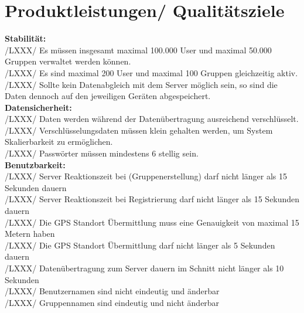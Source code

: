 \section{Produktleistungen/ Qualitätsziele}
\textbf{Stabilität:}\\
/LXXX/	Es müssen insgesamt maximal 100.000 User und maximal 50.000 Gruppen verwaltet werden können. \\
/LXXX/	Es sind maximal 200 User und maximal 100 Gruppen gleichzeitig aktiv. \\
/LXXX/	Sollte kein Datenabgleich mit dem Server möglich sein, so sind die Daten dennoch  auf den jeweiligen Geräten abgespeichert.	  \\
\textbf{Datensicherheit:}\\
/LXXX/	Daten werden während der Datenübertragung ausreichend verschlüsselt.\\
/LXXX/	Verschlüsselungsdaten müssen klein gehalten werden, um System Skalierbarkeit zu ermöglichen.\\
/LXXX/	Passwörter müssen mindestens 6 stellig sein.\\
\textbf{Benutzbarkeit:}\\
/LXXX/	Server Reaktionszeit bei (Gruppenerstellung) darf nicht länger als 15 Sekunden dauern\\
/LXXX/	Server Reaktionszeit bei Registrierung darf nicht länger als 15 Sekunden dauern\\
/LXXX/	Die GPS Standort Übermittlung muss eine Genauigkeit von maximal 15 Metern haben\\
/LXXX/	Die GPS Standort Übermittlung darf nicht länger als 5 Sekunden dauern  \\
/LXXX/	Datenübertragung zum Server dauern im Schnitt nicht länger als 10 Sekunden\\
/LXXX/	Benutzernamen sind nicht eindeutig und änderbar\\
/LXXX/	Gruppennamen sind eindeutig und nicht änderbar\\